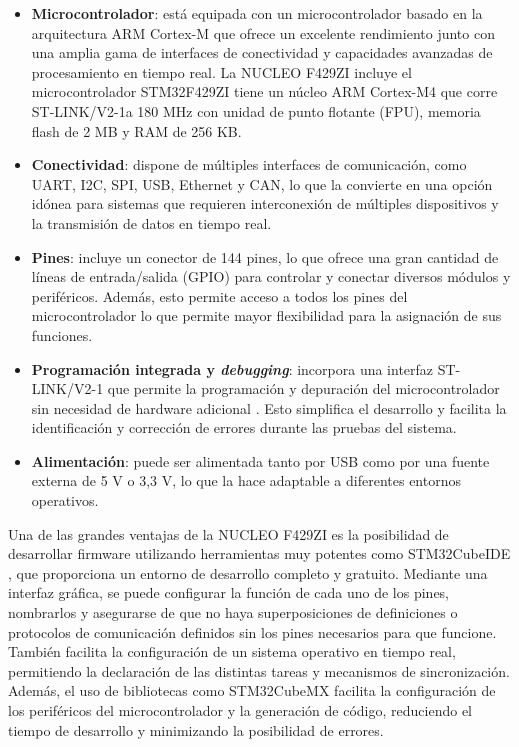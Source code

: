 \begin{itemize}
    \item \textbf{Microcontrolador}: está equipada con un microcontrolador basado en la arquitectura ARM Cortex-M que ofrece un excelente rendimiento junto con una amplia gama de interfaces de conectividad y capacidades avanzadas de procesamiento en tiempo real. La NUCLEO F429ZI incluye el microcontrolador STM32F429ZI \cite{stm32f429zi} tiene un núcleo ARM Cortex-M4 que corre ST-LINK/V2-1a 180 MHz con unidad de punto flotante (FPU), memoria flash de 2 MB y RAM de 256 KB. 

    \item \textbf{Conectividad}: dispone de múltiples interfaces de comunicación, como UART, I2C, SPI, USB, Ethernet y CAN, lo que la convierte en una opción idónea para sistemas que requieren interconexión de múltiples dispositivos y la transmisión de datos en tiempo real.

    \item \textbf{Pines}: incluye un conector de 144 pines, lo que ofrece una gran cantidad de líneas de entrada/salida (GPIO) para controlar y conectar diversos módulos y periféricos. Además, esto permite acceso a todos los pines del microcontrolador lo que permite mayor flexibilidad para la asignación de sus funciones.

    \item \textbf{Programación integrada y \textit{debugging}}: incorpora una interfaz ST-LINK/V2-1 que permite la programación y depuración del microcontrolador sin necesidad de hardware adicional \cite{st_link}. Esto simplifica el desarrollo y facilita la identificación y corrección de errores durante las pruebas del sistema.

    \item \textbf{Alimentación}: puede ser alimentada tanto por USB como por una fuente externa de 5 V o 3,3 V, lo que la hace adaptable a diferentes entornos operativos.
\end{itemize}

Una de las grandes ventajas de la NUCLEO F429ZI es la posibilidad de desarrollar firmware utilizando herramientas muy potentes como STM32CubeIDE \cite{stCubeIde}, que proporciona un entorno de desarrollo completo y gratuito. Mediante una interfaz gráfica, se puede configurar la función de cada uno de los pines, nombrarlos y asegurarse de que no haya superposiciones de definiciones o protocolos de comunicación definidos sin los pines necesarios para que funcione. También facilita la configuración de un sistema operativo en tiempo real, permitiendo la declaración de las distintas tareas y mecanismos de sincronización. Además, el uso de bibliotecas como STM32CubeMX \cite{stCubeMx} facilita la configuración de los periféricos del microcontrolador y la generación de código, reduciendo el tiempo de desarrollo y minimizando la posibilidad de errores. 


